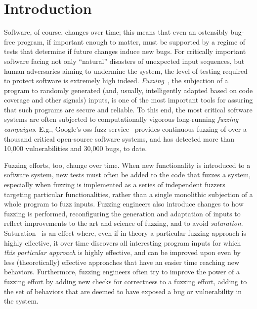 \section{Introduction}

Software, of course, changes over time; this means that even an ostensibly bug-free program, if important enough to matter, must be supported by a regime of tests that determine if future changes induce new bugs.  For critically important software facing not only ``natural'' disasters of unexpected input sequences, but human adversaries aiming to undermine the system, the level of testing required to protect software is extremely high indeed.  \emph{Fuzzing}~\cite{ArtSciFuzz}, the subjection of a program to randomly generated (and, usually, intelligently adapted based on code coverage and other signals) inputs, is one of the most important tools for assuring that such programs are secure and reliable.  To this end, the most critical software systems are often subjected to computationally vigorous long-running \emph{fuzzing campaigns}.  E.g., Google's oss-fuzz service~\cite{ossfuzz} provides continuous fuzzing of over a thousand critical open-source software systems, and has detected more than 10,000 vulnerabilities and 30,000 bugs, to date.

Fuzzing efforts, too, change over time.  When new functionality is introduced to a software system, new tests must often be added to the code that fuzzes a system, especially when fuzzing is implemented as a series of independent fuzzers targeting particular functionalities, rather than a single monolithic subjection of a whole program to fuzz inputs.  Fuzzing engineers also introduce changes to how fuzzing is performed, reconfiguring the generation and adaptation of inputs to reflect improvements to the art and science of fuzzing, and to avoid \emph{saturation}.  Saturation~\cite{SatFuzz,ReachCov} is an effect where, even if in theory a particular fuzzing approach is highly effective, it over time discovers all interesting program inputs for which \emph{this particular approach} is highly effective, and can be improved upon even by less (theoretically) effective approaches that have an easier time reaching new behaviors.  Furthermore, fuzzing engineers often try to improve the power of a fuzzing effort by adding new checks for correctness to a fuzzing effort, adding to the set of behaviors that are deemed to have exposed a bug or vulnerability in the system.

